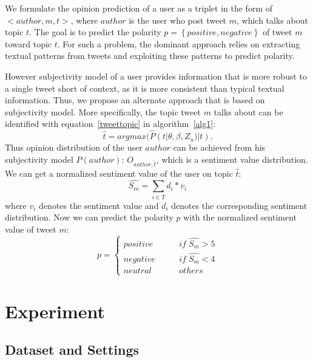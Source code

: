 \begin{landscape}
We formulate the opinion prediction of a user as a triplet in the form of $ < author, m, t >$, where $author$ is the user who post tweet $ m $, which talks about topic $ t $. The goal is to predict the polarity $ p=\left\{positive,negative\right\} $ of tweet $ m $ toward topic $ t $. For such a problem, the dominant approach relies on extracting textual patterns from tweets and exploiting these patterns to predict polarity.

However subjectivity model of a user provides information that is more robust to a single tweet short of context, as it is more consistent than typical textual information. Thus, we propose an alternate approach that is based on subjectivity model. More specifically, the topic tweet $ m $ talks about can be identified with equation~\ref{tweettopic} in algorithm~\ref{alg1}:
\begin{equation}
\widehat{t}=argmax(\widehat{P}(t| \theta,\beta ,Z_{u})|t).
\end{equation}
Thus opinion distribution of the user $author$ can be achieved from his subjectivity model $ P(author) $: $ O_{author,\widehat{t}} $, which is a sentiment value distribution. We can get a normalized sentiment value of the user on topic $ \widehat{t} $:
\begin{equation}
\widehat{S_{m}}=\sum_{i \in T}d_{i}\ast v_{i}
\end{equation}
where $ v_{i} $ denotes the sentiment value and $ d_{i} $ denotes the corresponding sentiment distribution.
Now we can predict the polarity $ p $ with the normalized sentiment value of tweet $ m $:
\begin{equation}
\label{polarity}
p= \left\{ 
\begin{array}{lll}
{positive} &  \qquad if \; \widehat{S_{m}} > 5 \\
{negative} &  \qquad if \; \widehat{S_{m}} < 4 \\
{neutral}  &   \qquad others \;  
\end{array}
\right.
\end{equation}

\section{Experiment}
\label{sec5}

\subsection{Dataset and Settings}


\end{landscape}
